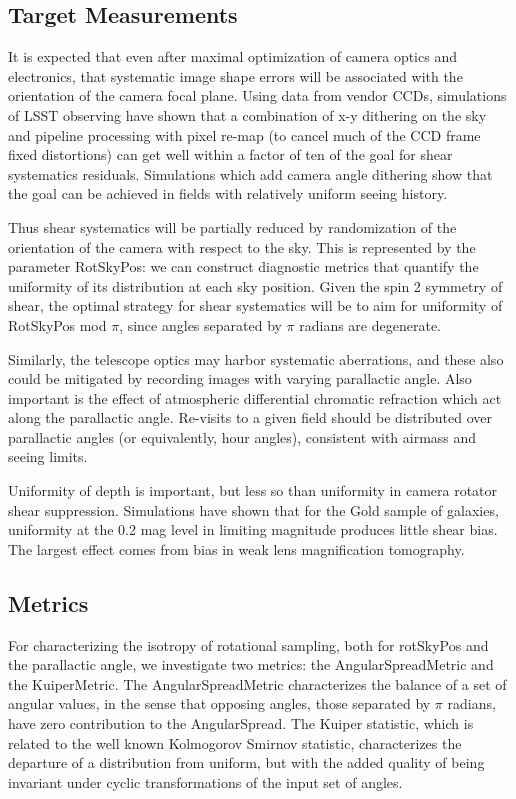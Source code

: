 \subsection{Target Measurements}

It is expected that even after maximal optimization of camera optics
and electronics, that systematic image shape errors will be associated
with the orientation of the camera focal plane.  Using data from vendor CCDs, simulations
of LSST observing have shown that a combination of x-y dithering on the sky and
pipeline processing with pixel re-map (to cancel much of the CCD frame fixed
distortions) can get well within a factor of ten of the goal for shear
systematics residuals.  Simulations which add camera angle dithering show
that the goal can be achieved in fields with relatively uniform seeing history.

Thus shear systematics will be partially reduced by randomization of the
orientation of the camera with respect to the sky.  This is
represented by the parameter RotSkyPos: we can construct diagnostic
metrics that quantify the uniformity of its distribution at each sky
position.   Given the spin 2 symmetry of shear, the optimal strategy for shear systematics
will be to aim for uniformity of RotSkyPos mod $\pi$, since angles separated by $\pi$ radians
are degenerate.

Similarly, the telescope optics may harbor systematic aberrations, and
these also could be mitigated by recording images with varying
parallactic angle.  Also important is the effect of atmospheric differential chromatic
refraction which act along the parallactic angle.  Re-visits to a given field should be
distributed over parallactic angles (or equivalently, hour angles), consistent with
airmass and seeing limits.

Uniformity of depth is important, but less so than uniformity in camera
rotator shear suppression.  Simulations have shown that for the Gold sample of galaxies,
uniformity at the 0.2 mag level in limiting magnitude produces little shear bias. The
largest effect comes from bias in weak lens magnification tomography.


\subsection{Metrics}

For characterizing the isotropy of rotational sampling, both for rotSkyPos and the parallactic
angle, we investigate two metrics: the AngularSpreadMetric and the KuiperMetric.  The
AngularSpreadMetric characterizes the balance of a set of angular values, in the sense that opposing
angles, those separated by $\pi$ radians, have zero contribution to the AngularSpread.  The Kuiper
statistic, which is related to the well known Kolmogorov Smirnov statistic, characterizes the
departure of a distribution from uniform, but with the added quality of being invariant under cyclic
transformations of the input set of angles.

